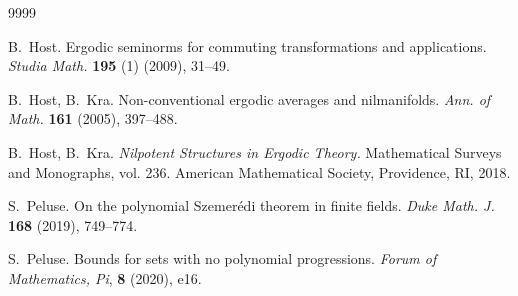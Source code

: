 \documentclass[11pt]{amsart}
\theoremstyle{definition}
\begin{document}
\begin{thebibliography}{9999}
	
	
	 B.~Host. Ergodic seminorms for commuting transformations and applications.
	{\em Studia Math.} {\bf 195} (1) (2009), 31--49.
	
	
	 B.~Host,  B.~Kra.
	Non-conventional ergodic averages and nilmanifolds. {\em Ann. of Math.}  \textbf{161}  (2005), 397--488.

	
	
	B.~Host, B.~Kra.
	{\em Nilpotent Structures in Ergodic Theory.}
	Mathematical Surveys and Monographs, vol. 236. American Mathematical Society, Providence, RI, 2018.



	

	
	

	
	
	
	 S.~Peluse. On the polynomial Szemer\'edi theorem in finite fields. {\em Duke
		Math. J.} \textbf{168} (2019), 749--774.
	
	 S.~Peluse. Bounds for sets with no polynomial progressions.  {\em  Forum of Mathematics, Pi}, {\bf 8} (2020), e16.
	

\end{thebibliography}
\end{document}
